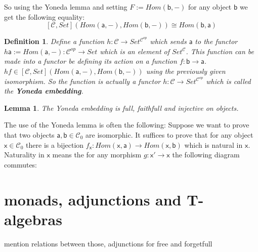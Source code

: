 \documentclass{article}
\newcommand{\cat}[1]{\mathcal{#1}} %
\newcommand{\cato}[1]{\cat{#1}_0} %
\newcommand{\ob}[1]{\mathsf{#1}} %
\newcommand{\catop}[1]{\cat{#1}^{op}}
\newtheorem{lemma}[theorem]{Lemma}
\newtheorem{definition}[theorem]{Definition}
\begin{document}
So using the Yoneda lemma and setting $F := Hom(\ob{b}, -)$ for any object $\ob{b}$ we get the following equality:
$$[\cat{C}, Set](Hom(\ob{a}, -), Hom(\ob{b}, -)) \cong Hom(\ob{b}, \ob{a})$$

\begin{definition}
	Define a function $h: \cat{C} \rightarrow Set^{\catop{C}}$ which sends $\ob{a}$ to the functor $h\ob{a} := Hom(\ob{a}, -): \catop{C} \rightarrow Set$ which is an element of $Set^\cat{C}$.
	This function can be made into a functor be defining its action on a function $f: \ob{b} \rightarrow \ob{a}$. $hf \in [\cat{C}, Set](Hom(\ob{a}, -), Hom(\ob{b}, -))$ using the previously given isomorphism.
	So the function is actually a functor $h: \cat{C} \rightarrow Set^{\catop{C}}$ which is called the \textbf{Yoneda embedding}.
\end{definition}

\begin{lemma}
	The Yoneda embedding is full, faithfull and injective on objects.
\end{lemma}

The use of the Yoneda lemma is often the following:
Suppose we want to prove that two objects $\ob{a}, \ob{b} \in \cato{C}$ are isomorphic.
It suffices to prove that for any object $\ob{x} \in \cato{C}$ there is a bijection $f_\ob{x}: Hom(\ob{x}, \ob{a}) \rightarrow Hom(\ob{x}, \ob{b})$ which is natural in $\ob{x}$.
Naturality in $\ob{x}$ means the for any morphism $g: \ob{x}' \rightarrow \ob{x}$ the following diagram commutes:



\section{monads, adjunctions and T-algebras}
mention relations between those, adjunctions for free and forgetfull 

\end{document}
